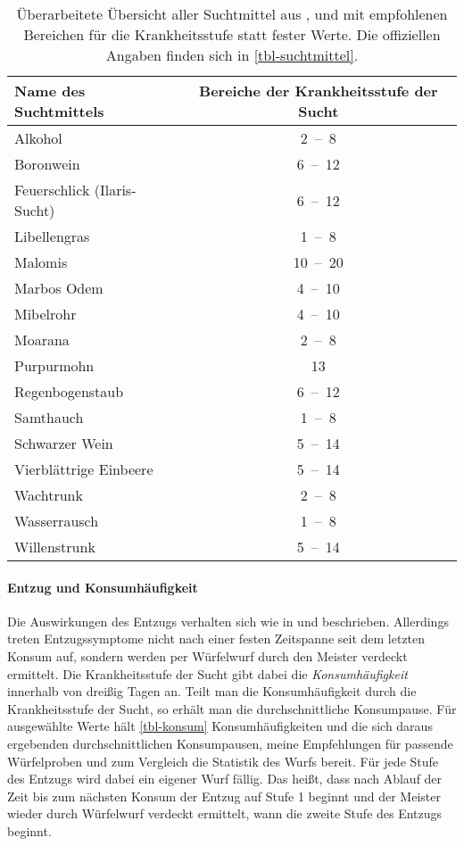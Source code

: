 \begin{table}
	\centering
	\caption[Suchtmittel mit flexiblen Krankheitsstufen]{Überarbeitete Übersicht aller Suchtmittel aus ,  und  mit empfohlenen Bereichen für die Krankheitsstufe statt fester Werte. Die offiziellen Angaben finden sich in \vref{tbl-suchtmittel}.\label{tbl-suchtmittel-revised}}
	\begin{tabular}{lc}
		\toprule
		{Name des Suchtmittels} & {Bereiche der Krankheitsstufe der Sucht} \\
		\hline
		Alkohol & 2~--~8 \\
		Boronwein & 6~--~12 \\
		Feuerschlick (Ilaris-Sucht) & 6~--~12 \\
		Libellengras & 1~--~8 \\
		Malomis & 10~--~20 \\
		Marbos Odem & 4~--~10 \\
		Mibelrohr & 4~--~10 \\
		Moarana & 2~--~8 \\
		Purpurmohn & 13 \\
		Regenbogenstaub & 6~--~12 \\
		Samthauch & 1~--~8 \\
		Schwarzer Wein & 5~--~14 \\
		Vierblättrige Einbeere & 5~--~14 \\
		Wachtrunk & 2~--~8 \\
		Wasserrausch & 1~--~8 \\
		Willenstrunk & 5~--~14 \\
		\bottomrule
	\end{tabular}
\end{table}

\paragraph{Entzug und Konsumhäufigkeit}
Die Auswirkungen des Entzugs verhalten sich wie in  und  beschrieben. Allerdings treten Entzugssymptome nicht nach einer festen Zeitspanne seit dem letzten Konsum auf, sondern werden per Würfelwurf durch den Meister verdeckt ermittelt. Die Krankheitsstufe der Sucht gibt dabei die \emph{Konsumhäufigkeit} innerhalb von dreißig Tagen an. Teilt man die Konsumhäufigkeit durch die Krankheitsstufe der Sucht, so erhält man die durchschnittliche Konsumpause. Für ausgewählte Werte hält \vref{tbl-konsum} Konsumhäufigkeiten und die sich daraus ergebenden durchschnittlichen Konsumpausen, meine Empfehlungen für passende Würfelproben und zum Vergleich die Statistik des Wurfs bereit. Für jede Stufe des Entzugs wird dabei ein eigener Wurf fällig. Das heißt, dass nach Ablauf der Zeit bis zum nächsten Konsum der Entzug auf Stufe 1 beginnt und der Meister wieder durch Würfelwurf verdeckt ermittelt, wann die zweite Stufe des Entzugs beginnt.

